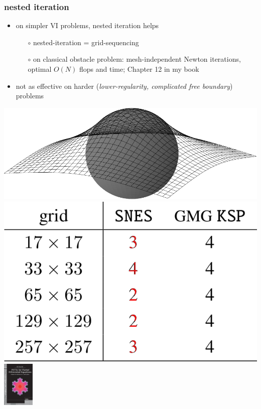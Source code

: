 \documentclass[svgnames,
               hyperref={colorlinks,citecolor=DeepPink4,linkcolor=FireBrick,urlcolor=Maroon},
               usepdftitle=false]  %
               {beamer}
\begin{document}
\begin{frame}[fragile]
\frametitle{nested iteration}

\begin{itemize}
\item on simpler VI problems, \alert{nested iteration} helps
    \begin{itemize}
    \item[$\circ$] nested-iteration = grid-sequencing
    \item[$\circ$] on classical obstacle problem: mesh-independent Newton iterations, optimal $O(N)$ flops and time; Chapter 12 in my book
    \end{itemize}
\item not as effective on harder (\emph{lower-regularity, complicated free boundary}) problems
\end{itemize}

\medskip
\includegraphics[height=0.15\textheight]{../talk-oxford/images/obstacle65.pdf} \qquad \includegraphics[height=0.25\textheight]{../talk-oxford/images/vi-newton-gmg-good.png} \qquad \includegraphics[width=15mm]{../talk-oxford/images/frontcover.jpg}
\end{frame}
\end{document}
